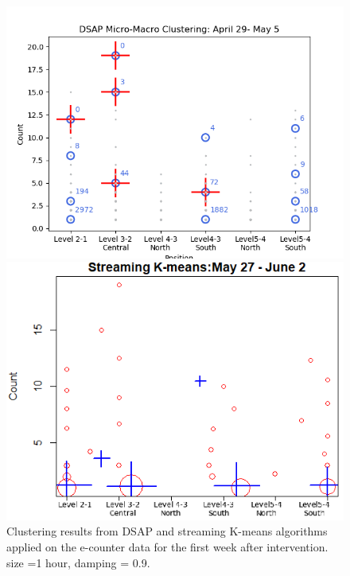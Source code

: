 \begin{figure}[h!]
\medskip
\begin{minipage}{0.45\textwidth}
\includegraphics[width=\linewidth]{image/Chapters/Chapter6/afterInte1week.png}
\end{minipage}
\begin{minipage}{0.45\textwidth}
\includegraphics[width=\linewidth]{image/Chapters/Chapter6/StreamKAfter.png}
\end{minipage}
\caption{Clustering results from DSAP and streaming K-means algorithms applied on the e-counter data for the first week after intervention.  size =1 hour, damping = 0.9.} \label{fig:f}

\end{figure}


